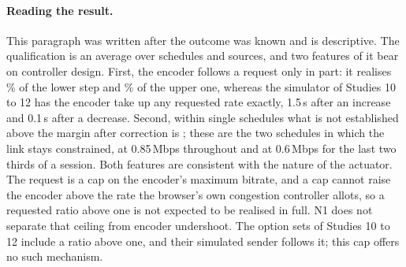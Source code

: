 \begin{table}[t]
\centering\small

\caption{Secondary: the two differences of Table~\ref{tab:n1-primary} within each capacity schedule, with the same bounds and Holm-corrected $p$ over the eight tests.}
\label{tab:n1-regimes}
\end{table}

\begin{table}[t]
\centering\small

\caption{Diagnostic: the two differences by complexity tercile, with 95\% intervals from the pooled within-tercile variance. The intervals are descriptive, and a tercile mean alone supports no conclusion.}
\label{tab:n1-complexity}
\end{table}

\begin{table}[t]
\centering\small
\resizebox{\linewidth}{!}{}
\caption{The analysed sources in the pre-drawn order, with their Wikimedia Commons page numbers. Title text in scripts the paper's font does not cover is elided as [\ldots]; full titles, authors, URLs, licence evidence and file hashes are recorded under \texttt{acquisition/native-n1/}.}
\label{tab:n1-sources}
\end{table}

\paragraph{Reading the result.}
This paragraph was written after the outcome was known and is descriptive. The qualification is an average over schedules and sources, and two features of it bear on controller design. First, the encoder follows a request only in part: it realises \NOneLowerShare\% of the lower step and \NOneUpperShare\% of the upper one, whereas the simulator of Studies 10 to 12 has the encoder take up any requested rate exactly, 1.5\,s after an increase and 0.1\,s after a decrease. Second, within single schedules what is not established above the margin after correction is \NOneRegimeOpen{}; these are the two schedules in which the link stays constrained, at 0.85\,Mbps throughout and at 0.6\,Mbps for the last two thirds of a session. Both features are consistent with the nature of the actuator. The request is a cap on the encoder's maximum bitrate, and a cap cannot raise the encoder above the rate the browser's own congestion controller allots, so a requested ratio above one is not expected to be realised in full. N1 does not separate that ceiling from encoder undershoot. The option sets of Studies 10 to 12 include a ratio above one, and their simulated sender follows it; this cap offers no such mechanism.
\ifdefined\NOneExpLevelLow
